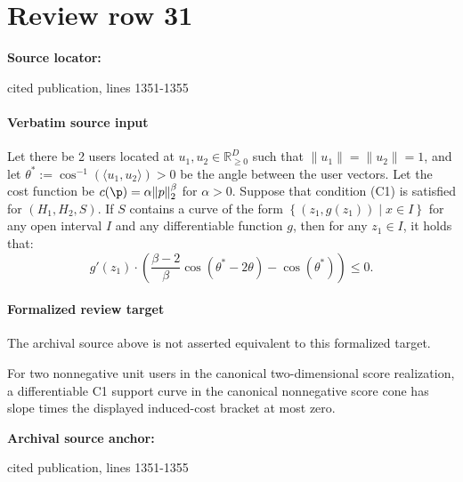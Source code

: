 \documentclass[10pt]{article}
\begin{document}
\section*{Review row 31}
\textbf{Source locator:} {\footnotesize\raggedright cited publication, lines 1351-\allowbreak{}1355\par}
\paragraph{Verbatim source input}
\begin{ReviewVerbatim}
\begin{lemma}
\label{lemma:regionscolor}
Let there be 2 users located at $u_1, u_2 \in \mathbb{R}_{\ge 0}^D$ such that  $\|u_1\| = \|u_2\| = 1$, and let $\theta^* := \cos^{-1}\left( \langle u_1, u_2\rangle \right) > 0$ be the angle between the user vectors. Let the cost function be $c(\p) = \alpha \|p\|_2^{\beta}$ for $\alpha > 0$. Suppose that condition (C1) is satisfied for $(H_1, H_2, S)$. If $S$ contains a curve of the form $\left\{(z_1, g(z_1)) \mid x \in I \right\}$ for any open interval $I$ and any differentiable function $g$, then for any $z_1 \in I$, it holds that:
\[g'(z_1) \cdot \left(\frac{\beta - 2}{\beta} \cos(\theta^* - 2 \theta) - \cos(\theta^*) \right) \le 0.\]
\end{lemma}
\end{ReviewVerbatim}


\paragraph{Formalized review target}
The archival source above is not asserted equivalent to this formalized target.
\begin{ReviewVerbatim}
For two nonnegative unit users in the canonical two-dimensional score realization, a differentiable C1 support curve in the canonical nonnegative score cone has slope times the displayed induced-cost bracket at most zero.
\end{ReviewVerbatim}

\textbf{Archival source anchor:} {\footnotesize\raggedright cited publication, lines 1351-\allowbreak{}1355\par}
\end{document}
